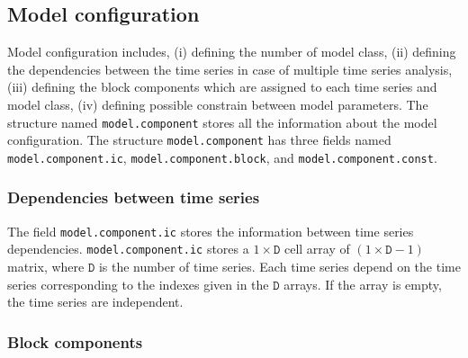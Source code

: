 \subsection{Model configuration}
\label{S:MODELCONFIGURATION}
Model configuration includes, (i) defining the number of model class, (ii) defining the dependencies between the time series in case of multiple time series analysis, (iii) defining the block components which are assigned to each time series and model class, (iv) defining possible constrain between model parameters.
The \MATLAB{} structure named \lstinline[basicstyle = \mlttfamily]!model.component! stores all the information about the model configuration.
The structure \lstinline[basicstyle = \mlttfamily]!model.component! has three fields named  \lstinline[basicstyle = \mlttfamily]!model.component.ic!, \lstinline[basicstyle = \mlttfamily]!model.component.block!, and \lstinline[basicstyle = \mlttfamily]!model.component.const!.

\subsubsection{Dependencies between time series}

The field \lstinline[basicstyle = \mlttfamily]!model.component.ic! stores the information between time series dependencies.
\lstinline[basicstyle = \mlttfamily \small ]!model.component.ic! stores a $1\times \mathtt{D}$ cell array of $(1\times \mathtt{D}-1)$ matrix, where $\mathtt{D}$ is the number of time series.
Each time series depend on the time series corresponding to the indexes given in the $\mathtt{D}$ arrays.
If the array is empty, the time series are independent.

\subsubsection{Block components}

